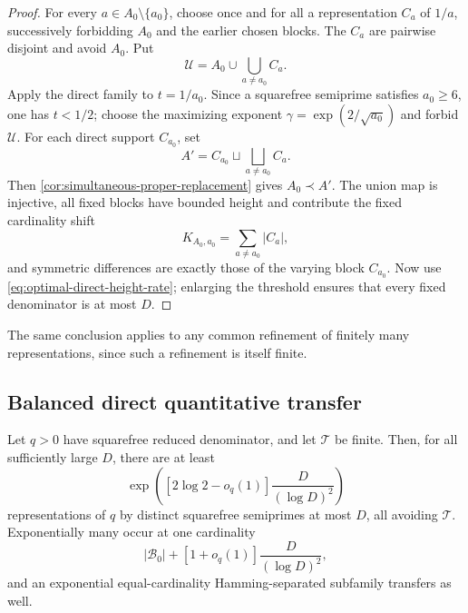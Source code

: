 \begin{proof}
For every $a\in A_0\setminus\{a_0\}$, choose once and for all a representation $C_a$ of $1/a$, successively forbidding $A_0$ and the earlier chosen blocks.  The $C_a$ are pairwise disjoint and avoid $A_0$.  Put
\[
 \mathcal U=A_0\cup\bigcup_{a\neq a_0}C_a.
\]
Apply the direct family to $t=1/a_0$.  Since a squarefree semiprime satisfies $a_0\geq6$, one has $t<1/2$; choose the maximizing exponent $\gamma=\exp(2/\sqrt{a_0})$ and forbid $\mathcal U$.  For each direct support $C_{a_0}$, set
\[
 A'=C_{a_0}\sqcup\bigsqcup_{a\neq a_0}C_a.
\]
Then \cref{cor:simultaneous-proper-replacement} gives $A_0\prec A'$.  The union map is injective, all fixed blocks have bounded height and contribute the fixed cardinality shift
\[
 K_{A_0,a_0}=\sum_{a\neq a_0}|C_a|,
\]
and symmetric differences are exactly those of the varying block $C_{a_0}$.  Now use \cref{eq:optimal-direct-height-rate}; enlarging the threshold ensures that every fixed denominator is at most $D$.
\end{proof}

The same conclusion applies to any common refinement of finitely many representations, since such a refinement is itself finite.

\subsection{Balanced direct quantitative transfer}

\begin{corollary}
\label{cor:global-quantitative-transfer}
Let $q>0$ have squarefree reduced denominator, and let $\mathcal T$ be finite.  Then, for all sufficiently large $D$, there are at least
\begin{equation}
\label{eq:global-height-count}
 \exp\left(\left[2\log2-o_q(1)\right]
 \frac{D}{(\log D)^2}\right)
\end{equation}
representations of $q$ by distinct squarefree semiprimes at most $D$, all avoiding $\mathcal T$.  Exponentially many occur at one cardinality
\begin{equation}
\label{eq:global-height-cardinality}
 |\mathcal B_0|+
 \left[1+o_q(1)\right]\frac{D}{(\log D)^2},
\end{equation}
and an exponential equal-cardinality Hamming-separated subfamily transfers as well.
\end{corollary}

